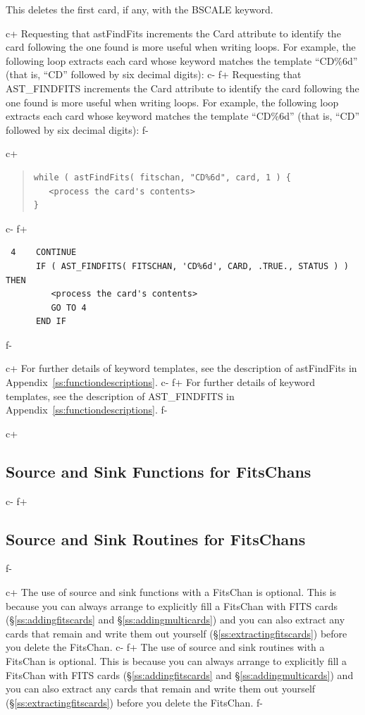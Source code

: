 \documentclass[twoside,11pt]{article}
\newcommand{\appref}[1]{Appendix~\ref{#1}}
\newcommand{\secref}[1]{\S\ref{#1}}
\newcommand{\appref}[1]{\ref{#1}}
\newcommand{\secref}[1]{\ref{#1}}
\begin{document}
This deletes the first card, if any, with the BSCALE keyword.

c+
Requesting that astFindFits increments the Card attribute to identify
the card following the one found is more useful when writing loops.
For example, the following loop extracts each card whose keyword
matches the template ``CD\%6d'' (that is, ``CD'' followed by six
decimal digits):
c-
f+
Requesting that AST\_FINDFITS increments the Card attribute to
identify the card following the one found is more useful when writing
loops.  For example, the following loop extracts each card whose
keyword matches the template ``CD\%6d'' (that is, ``CD'' followed by
six decimal digits):
f-

c+
\begin{quote}
\small
\begin{verbatim}
while ( astFindFits( fitschan, "CD%6d", card, 1 ) {
   <process the card's contents>
}
\end{verbatim}
\normalsize
\end{quote}
c-
f+
\small
\begin{verbatim}
 4    CONTINUE
      IF ( AST_FINDFITS( FITSCHAN, 'CD%6d', CARD, .TRUE., STATUS ) ) THEN
         <process the card's contents>
         GO TO 4
      END IF
\end{verbatim}
\normalsize
f-

c+
For further details of keyword templates, see the description of
astFindFits in \appref{ss:functiondescriptions}.
c-
f+
For further details of keyword templates, see the description of
AST\_FINDFITS in \appref{ss:functiondescriptions}.
f-

c+
\subsection{\label{ss:fitssourceandsink}Source and Sink Functions for FitsChans}
c-
f+
\subsection{\label{ss:fitssourceandsink}Source and Sink Routines for FitsChans}
f-

c+
The use of source and sink functions with a FitsChan is optional. This
is because you can always arrange to explicitly fill a FitsChan with
FITS cards (\secref{ss:addingfitscards} and \secref{ss:addingmulticards})
and you can also extract any
cards that remain and write them out yourself
(\secref{ss:extractingfitscards}) before you delete the FitsChan.
c-
f+
The use of source and sink routines with a FitsChan is optional. This
is because you can always arrange to explicitly fill a FitsChan with
FITS cards (\secref{ss:addingfitscards} and \secref{ss:addingmulticards})
and you can also extract any
cards that remain and write them out yourself
(\secref{ss:extractingfitscards}) before you delete the FitsChan.
f-
\end{document}
